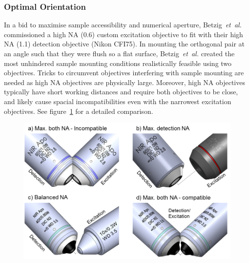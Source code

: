\subsubsection{Optimal Orientation}

In a bid to maximise sample accessibility and numerical aperture, Betzig~\emph{et~al.}~\cite{chen_lattice_2014} commissioned a high NA (0.6) custom excitation objective to fit with their high NA (1.1) detection objective (Nikon CFI75).
In mounting the orthogonal pair at an angle such that they were flush so a flat surface, Betzig~\emph{et~al.} created the most unhindered sample mounting conditions realistically feasible using two objectives.
Tricks to circumvent objectives interfering with sample mounting are needed as high NA objectives are physically large.
Moreover,  high NA objectives typically have short working distances and require both objectives to be close, and likely cause spacial incompatibilities even with the narrowest excitation objectives.
See figure~\ref{fig:objectivecompatibility} for a detailed comparison.

\begin{figure}
	\includegraphics[width=\columnwidth]{objectivecompatibility}
	\label{fig:objectivecompatibility}
	\caption{}
\end{figure}


